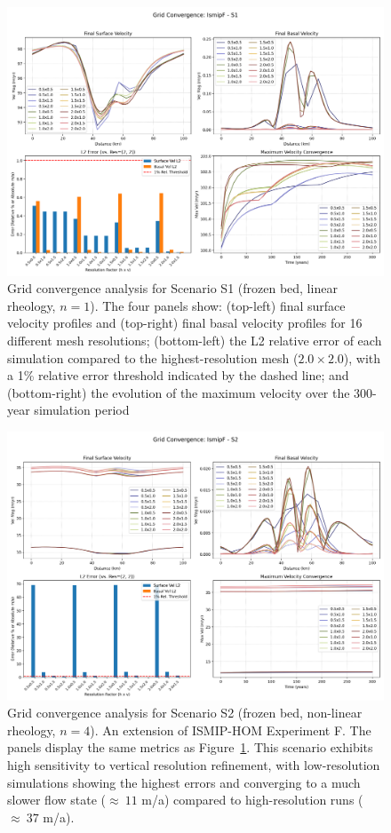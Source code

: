 \begin{figure}[H]
    \includegraphics[scale=0.40]{figures/IsmipF_S1_convergence_summary.png}
    \caption{Grid convergence analysis for Scenario S1 (frozen bed, linear rheology, $n=1$). The four panels show: (top-left) final surface velocity profiles and (top-right) final basal velocity profiles for 16 different mesh resolutions; (bottom-left) the L2 relative error of each simulation compared to the highest-resolution mesh ($2.0\times2.0$), with a 1\% relative error threshold indicated by the dashed line; and (bottom-right) the evolution of the maximum velocity over the 300-year simulation period}
    \label{fig:grid_conv_S1}
\end{figure}
\begin{figure}[H]
    \includegraphics[scale=0.40]{figures/IsmipF_S2_convergence_summary.png}
    \caption{Grid convergence analysis for Scenario S2 (frozen bed, non-linear rheology, $n=4$). An extension of ISMIP-HOM Experiment F. The panels display the same metrics as Figure~\ref{fig:grid_conv_S1}. This scenario exhibits high sensitivity to vertical resolution refinement, with low-resolution simulations showing the highest errors and converging to a much slower flow state ($\approx~11$ m/a) compared to high-resolution runs ($\approx~37$ m/a).}
    \label{fig:grid_conv_S2}
\end{figure}
